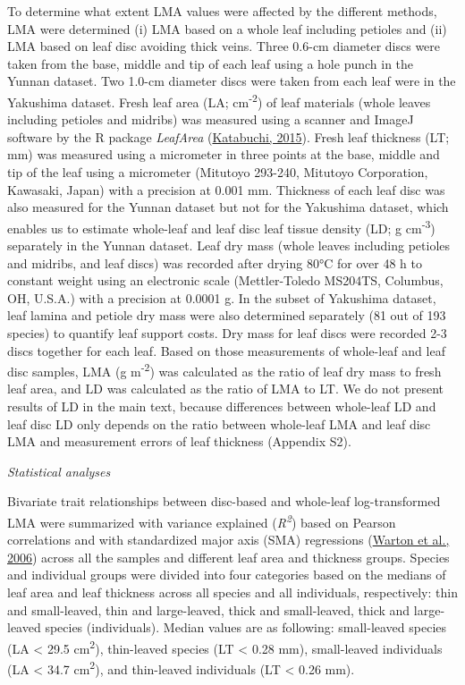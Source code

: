\documentclass[
  12pt,
  a4paper,
,tablecaptionabove
]{scrartcl}
\begin{document}
To determine what extent LMA values were affected by the different
methods, LMA were determined (i) LMA based on a whole leaf including
petioles and (ii) LMA based on leaf disc avoiding thick veins. Three
0.6-cm diameter discs were taken from the base, middle and tip of each
leaf using a hole punch in the Yunnan dataset. Two 1.0-cm diameter discs
were taken from each leaf were in the Yakushima dataset. Fresh leaf area
(LA; cm\textsuperscript{-2}) of leaf materials (whole leaves including
petioles and midribs) was measured using a scanner and ImageJ software
by the R package \emph{LeafArea}
(\protect\hyperlink{ref-Katabuchi2015}{Katabuchi, 2015}). Fresh leaf
thickness (LT; mm) was measured using a micrometer in three points at
the base, middle and tip of the leaf using a micrometer (Mitutoyo
293-240, Mitutoyo Corporation, Kawasaki, Japan) with a precision at
0.001 mm. Thickness of each leaf disc was also measured for the Yunnan
dataset but not for the Yakushima dataset, which enables us to estimate
whole-leaf and leaf disc leaf tissue density (LD; g
cm\textsuperscript{-3}) separately in the Yunnan dataset. Leaf dry mass
(whole leaves including petioles and midribs, and leaf discs) was
recorded after drying 80°C for over 48 h to constant weight using an
electronic scale (Mettler-Toledo MS204TS, Columbus, OH, U.S.A.) with a
precision at 0.0001 g. In the subset of Yakushima dataset, leaf lamina
and petiole dry mass were also determined separately (81 out of 193
species) to quantify leaf support costs. Dry mass for leaf discs were
recorded 2-3 discs together for each leaf. Based on those measurements
of whole-leaf and leaf disc samples, LMA (g m\textsuperscript{-2}) was
calculated as the ratio of leaf dry mass to fresh leaf area, and LD was
calculated as the ratio of LMA to LT. We do not present results of LD in
the main text, because differences between whole-leaf LD and leaf disc
LD only depends on the ratio between whole-leaf LMA and leaf disc LMA
and measurement errors of leaf thickness (Appendix S2).

\emph{Statistical analyses}

Bivariate trait relationships between disc-based and whole-leaf
log-transformed LMA were summarized with variance explained
(\emph{R\textsuperscript{2}}) based on Pearson correlations and with
standardized major axis (SMA) regressions
(\protect\hyperlink{ref-Warton2006}{Warton et al., 2006}) across all the
samples and different leaf area and thickness groups. Species and
individual groups were divided into four categories based on the medians
of leaf area and leaf thickness across all species and all individuals,
respectively: thin and small-leaved, thin and large-leaved, thick and
small-leaved, thick and large-leaved species (individuals). Median
values are as following: small-leaved species (LA \textless{} 29.5
cm\textsuperscript{2}), thin-leaved species (LT \textless{} 0.28 mm),
small-leaved individuals (LA \textless{} 34.7 cm\textsuperscript{2}),
and thin-leaved individuals (LT \textless{} 0.26 mm).
\end{document}
